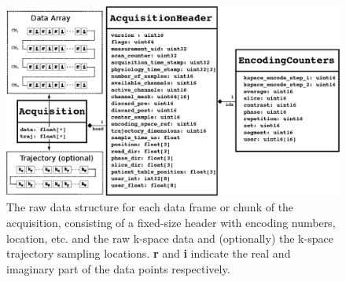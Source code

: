 \documentclass[12pt, draft]{article}
\begin{document}
\begin{figure}
\begin{center}
\includegraphics[width=6in]{figure2_uml_diagram.eps}
\caption{The raw data structure for each data frame or chunk of the acquisition, consisting of a fixed-size header with encoding numbers, location, etc. and the raw k-space data and (optionally) the k-space trajectory sampling locations. \textbf{r} and \textbf{i} indicate the real and imaginary part of the data points respectively.}
\label{fig:cstruct}
\end{center}
\end{figure}
\end{document}
